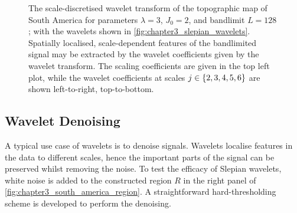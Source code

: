 \begin{figure}[htp]
	\centering
	\hfill
	\newline
	\hfill
	\newline
	\hfill
	\caption{
		The scale-discretised wavelet transform of the topographic map of South America for parameters \(\lambda=3\), \(J_{0}=2\), and bandlimit \(L=128\); \ie{} with the wavelets shown in \cref{fig:chapter3_slepian_wavelets}.
		Spatially localised, scale-dependent features of the bandlimited signal may be extracted by the wavelet coefficients given by the wavelet transform.
		The scaling coefficients are given in the top left plot, while the wavelet coefficients at scales \(j \in \{2, 3, 4, 5, 6\}\) are shown left-to-right, top-to-bottom.
	}\label{fig:chapter3_slepian_wavelet_coefficients}
\end{figure}

\subsection{Wavelet Denoising}\label{sec:chapter3_wavelet_denoising}

A typical use case of wavelets is to denoise signals.
Wavelets localise features in the data to different scales, hence the important parts of the signal can be preserved whilst removing the noise.
To test the efficacy of Slepian wavelets, white noise is added to the constructed region \(R\) in the right panel of \cref{fig:chapter3_south_america_region}.
A straightforward hard-thresholding scheme is developed to perform the denoising.


